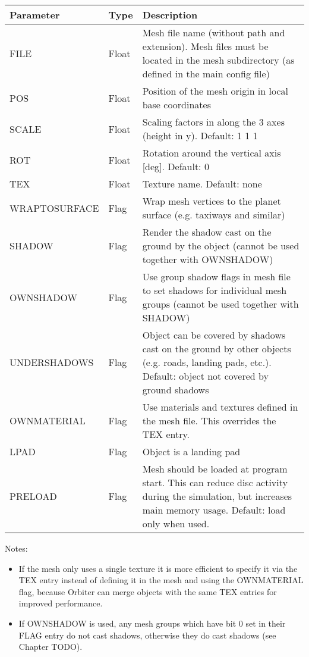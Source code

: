 \documentclass[Orbiter Developer Manual.tex]{subfiles}
\begin{document}
	\begin{longtable}{ |p{}|p{}|p{}| }
	\hline\rule{0pt}{2ex}
	\textbf{Parameter} & \textbf{Type} & \textbf{Description}\\
	\hline\rule{0pt}{2ex}
	FILE & Float & Mesh file name (without path and extension). Mesh files must be located in the mesh subdirectory (as defined in the main config file)\\
	\hline\rule{0pt}{2ex}
	POS & Float & Position of the mesh origin in local base coordinates\\
	\hline\rule{0pt}{2ex}
	SCALE & Float & Scaling factors in along the 3 axes (height in y). Default: 1 1 1\\
	\hline\rule{0pt}{2ex}
	ROT & Float & Rotation around the vertical axis [deg]. Default: 0\\
	\hline\rule{0pt}{2ex}
	TEX & Float & Texture name. Default: none\\
	\hline\rule{0pt}{2ex}
	WRAPTOSURFACE & Flag & Wrap mesh vertices to the planet surface (e.g. taxiways and similar)\\
	\hline\rule{0pt}{2ex}
	SHADOW & Flag & Render the shadow cast on the ground by the object (cannot be used together with OWNSHADOW)\\
	\hline\rule{0pt}{2ex}
	OWNSHADOW & Flag & Use group shadow flags in mesh file to set shadows for individual mesh groups (cannot be used together with SHADOW)\\
	\hline\rule{0pt}{2ex}
	UNDERSHADOWS & Flag & Object can be covered by shadows cast on the ground by other objects (e.g. roads, landing pads, etc.). Default: object not covered by ground shadows\\
	\hline\rule{0pt}{2ex}
	OWNMATERIAL & Flag & Use materials and textures defined in the mesh file. This overrides the TEX entry.\\
	\hline\rule{0pt}{2ex}
	LPAD & Flag & Object is a landing pad\\
	\hline\rule{0pt}{2ex}
	PRELOAD & Flag & Mesh should be loaded at program start. This can reduce disc activity during the simulation, but increases main memory usage. Default: load only when used.\\
	\hline
	\end{longtable}

\noindent
Notes:

\begin{itemize}
\item If the mesh only uses a single texture it is more efficient to specify it via the TEX entry instead of defining it in the mesh and using the OWNMATERIAL flag, because Orbiter can merge objects with the same TEX entries for improved performance.
\item If OWNSHADOW is used, any mesh groups which have bit 0 set in their FLAG entry do not cast shadows, otherwise they do cast shadows (see Chapter TODO).
\end{itemize}
\end{document}
